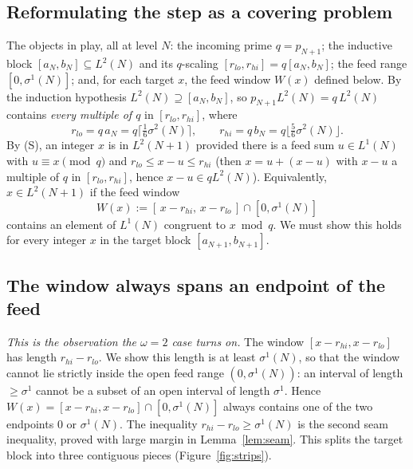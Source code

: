 \documentclass[11pt]{amsart}
\theoremstyle{plain}
\theoremstyle{definition}
\begin{document}
\subsection{Reformulating the step as a covering problem}
The objects in play, all at level $N$: the incoming prime $q=p_{N+1}$; the
inductive block $[a_N,b_N]\subseteq L^2(N)$ and its $q$-scaling
$[r_{lo},r_{hi}]=q[a_N,b_N]$; the feed range $[0,\sigma^1(N)]$; and, for each target
$x$, the feed window $W(x)$ defined below.
By the induction hypothesis $L^2(N)\supseteq[a_N,b_N]$, so
$p_{N+1}L^2(N)=q\,L^2(N)$ contains \emph{every multiple of $q$} in
$[r_{lo},r_{hi}]$, where
\[
r_{lo}=q\,a_N=q\bigl\lceil\tfrac16\sigma^2(N)\bigr\rceil,\qquad
r_{hi}=q\,b_N=q\bigl\lfloor\tfrac56\sigma^2(N)\bigr\rfloor.
\]
By (S), an integer $x$ is in $L^2(N+1)$ provided there is a feed sum
$u\in L^1(N)$ with $u\equiv x\pmod q$ and $r_{lo}\le x-u\le r_{hi}$ (then
$x=u+(x-u)$ with $x-u$ a multiple of $q$ in $[r_{lo},r_{hi}]$, hence
$x-u\in qL^2(N)$).  Equivalently, $x\in L^2(N+1)$ if the feed window
\[
W(x):=[\,x-r_{hi},\,x-r_{lo}\,]\cap[0,\sigma^1(N)]
\]
contains an element of $L^1(N)$ congruent to $x\bmod q$.  We must show this holds
for every integer $x$ in the target block $[a_{N+1},b_{N+1}]$.

\subsection{The window always spans an endpoint of the feed}
\emph{This is the observation the $\omega=2$ case turns on.}
The window $[x-r_{hi},x-r_{lo}]$ has length $r_{hi}-r_{lo}$.  We show this length
is at least $\sigma^1(N)$, so that the window cannot lie strictly inside the open
feed range $(0,\sigma^1(N))$: an interval of length $\ge\sigma^1$ cannot be a
subset of an open interval of length $\sigma^1$.  Hence
$W(x)=[x-r_{hi},x-r_{lo}]\cap[0,\sigma^1(N)]$ always contains one of the two
endpoints $0$ or $\sigma^1(N)$.  The inequality $r_{hi}-r_{lo}\ge\sigma^1(N)$ is
the second seam inequality, proved with large margin in
Lemma~\ref{lem:seam}.  This splits the target block into three contiguous
pieces (Figure~\ref{fig:strips}).
\end{document}

